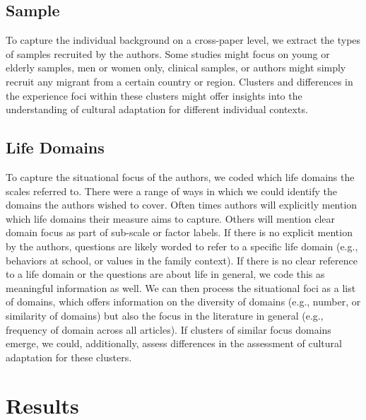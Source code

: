 \documentclass[man, 12pt, a4paper]{apa7}
\begin{document}
\subsection{Sample}
To capture the individual background on a cross-paper level, we extract the types of samples recruited by the authors. Some studies might focus on young or elderly samples, men or women only, clinical samples, or authors might simply recruit any migrant from a certain country or region. Clusters and differences in the experience foci within these clusters might offer insights into the understanding of cultural adaptation for different individual contexts.

\subsection{Life Domains}
To capture the situational focus of the authors, we coded which life domains the scales referred to. There were a range of ways in which we could identify the domains the authors wished to cover. Often times authors will explicitly mention which life domains their measure aims to capture. Others will mention clear domain focus as part of sub-scale or factor labels. If there is no explicit mention by the authors, questions are likely worded to refer to a specific life domain (e.g., behaviors at school, or values in the family context). If there is no clear reference to a life domain or the questions are about life in general, we code this as meaningful information as well. We can then process the situational foci as a list of domains, which offers information on the diversity of domains (e.g., number, or similarity of domains) but also the focus in the literature in general (e.g., frequency of domain across all articles). If clusters of similar focus domains emerge, we could, additionally, assess differences in the assessment of cultural adaptation for these clusters.

\section{Results}


\printbibliography
\end{document}
